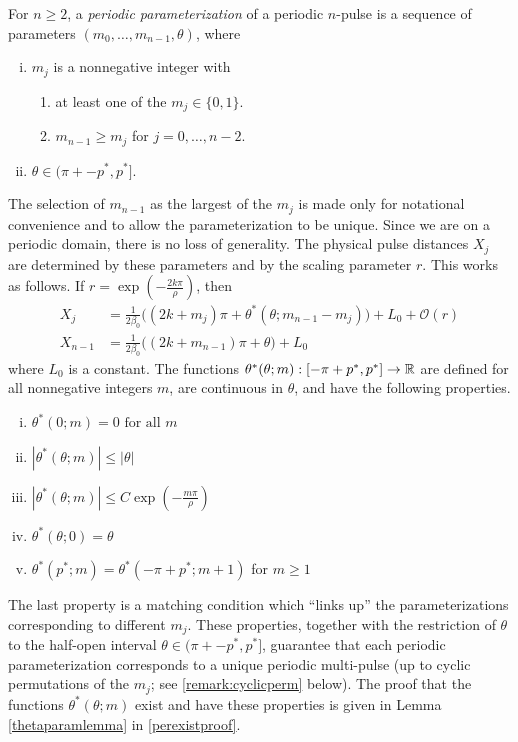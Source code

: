 \documentclass[thesis.tex]{subfiles}
\begin{document}
\begin{definition}\label{def:perparam}
For $n \geq 2$, a \emph{periodic parameterization} of a periodic $n$-pulse is a sequence of parameters $(m_0, \dots, m_{n-1}, \theta)$, where
\begin{enumerate}[(i)]
\item $m_j$ is a nonnegative integer with
\begin{enumerate}
\item at least one of the $m_j \in \{0, 1\}$.
\item $m_{n-1} \geq m_j$ for $j = 0, \dots, n-2$.
\end{enumerate}
\item $\theta \in (\pi + -p^*, p^*]$.
\end{enumerate}
\end{definition}
The selection of $m_{n-1}$ as the largest of the $m_j$ is made only for notational convenience and to allow the parameterization to be unique. Since we are on a periodic domain, there is no loss of generality. The physical pulse distances $X_j$ are determined by these parameters and by the scaling parameter $r$. This works as follows. If $r = \exp\left(-\frac{2 k \pi}{\rho}\right)$, then
\begin{align*}
X_j &= \frac{1}{2 \beta_0}\big( (2 k + m_j)\pi + \theta^*(\theta; m_{n-1} - m_j)\big) + L_0 + \mathcal{O}(r) \\
X_{n-1} &= \frac{1}{2 \beta_0}\big( (2 k + m_{n-1})\pi + \theta \big) + L_0
\end{align*}
where $L_0$ is a constant. The functions $\theta^*(\theta; m): [-\pi + p^*, p^*] \rightarrow \mathbb{R}$ are defined for all nonnegative integers $m$, are continuous in $\theta$, and have the following properties.
\begin{enumerate}[(i)]
\item $\theta^*(0; m) = 0 \text{ for all } m$
\item $|\theta^*(\theta; m)| \leq |\theta|$
\item $|\theta^*(\theta; m)| \leq C \exp\left(-\frac{m \pi}{\rho} \right)$
\item $\theta^*(\theta; 0) = \theta $
\item $\theta^*(p^*; m) = \theta^*(-\pi+p^*; m+1)$ for $m \geq 1$
\end{enumerate}
The last property is a matching condition which ``links up'' the parameterizations corresponding to different $m_j$. These properties, together with the restriction of $\theta$ to the half-open interval $\theta \in (\pi + -p^*, p^*]$, guarantee that each periodic parameterization corresponds to a unique periodic multi-pulse (up to cyclic permutations of the $m_j$; see \cref{remark:cyclicperm} below). The proof that the functions $\theta^*(\theta; m)$ exist and have these properties is given in Lemma \ref{thetaparamlemma} in \cref{perexistproof}. 
\end{document}
